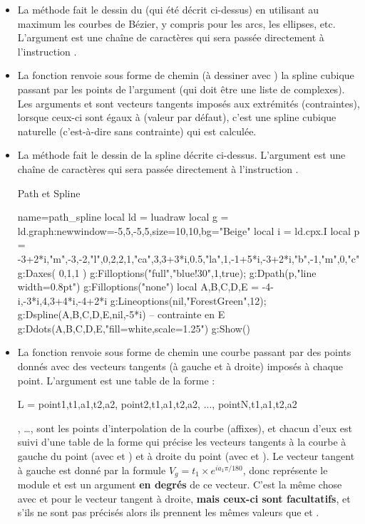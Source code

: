 \begin{itemize}
\item La méthode  fait le dessin du  (qui été décrit ci-dessus) en utilisant au maximum les courbes de Bézier, y compris pour les arcs, les ellipses, etc. L'argument  est une chaîne de caractères qui sera passée directement à l'instruction \drawcmd.
 
\item La fonction  renvoie sous forme de chemin (à dessiner avec ) la spline cubique passant par les points de l'argument  (qui doit être une liste de complexes). Les arguments  et  sont vecteurs tangents imposés aux extrémités (contraintes), lorsque ceux-ci sont égaux à \nil (valeur par défaut), c'est une spline cubique naturelle (c'est-à-dire sans contrainte) qui est calculée.

\item La méthode  fait le dessin de la spline décrite ci-dessus. L'argument  est une chaîne de caractères qui sera passée directement à l'instruction \drawcmd.

\begin{demo}{Path et Spline}
\begin{luadraw}{name=path_spline}
local ld = luadraw
local g = ld.graph:new{window={-5,5,-5,5},size={10,10},bg="Beige"}
local i = ld.cpx.I
local p = {-3+2*i,"m",-3,-2,"l",0,2,2,1,"ca",3,3+3*i,0.5,"la",1,-1+5*i,-3+2*i,"b",-1,"m",0,"c"}
g:Daxes( {0,1,1} )
g:Filloptions("full","blue!30",1,true); g:Dpath(p,"line width=0.8pt")
g:Filloptions("none")
local A,B,C,D,E = -4-i,-3*i,4,3+4*i,-4+2*i
g:Lineoptions(nil,"ForestGreen",12); g:Dspline({A,B,C,D,E},nil,-5*i) -- contrainte en E
g:Ddots({A,B,C,D,E},"fill=white,scale=1.25")
g:Show()
\end{luadraw}
\end{demo}

\item La fonction  renvoie sous forme de chemin une courbe passant par des points donnés avec des vecteurs tangents (à gauche et à droite) imposés à chaque point. L'argument  est une table de la forme :
\begin{Luacode}
L = {point1,{t1,a1,t2,a2}, point2,{t1,a1,t2,a2}, ..., pointN,{t1,a1,t2,a2}}
\end{Luacode}
, \ldots,  sont les points d'interpolation de la courbe (affixes), et chacun d'eux est suivi d'une table de la forme  qui précise les vecteurs tangents à la courbe à gauche du point (avec  et ) et à droite du point (avec  et ). Le vecteur tangent à gauche est donné par la formule $V_g = t_1\times e^{ia_1\pi/180}$, donc  représente le module et  est un argument \textbf{en degrés} de ce vecteur. C'est la même chose avec  et  pour le vecteur tangent à droite, \textbf{mais ceux-ci sont facultatifs}, et s'ils ne sont pas précisés alors ils prennent les mêmes valeurs que  et .


\end{itemize}

